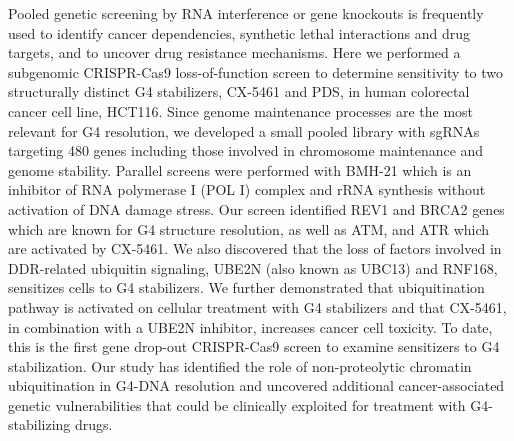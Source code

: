 Pooled genetic screening by RNA interference or gene knockouts is frequently used to identify cancer dependencies, synthetic lethal interactions and drug targets, and to uncover drug resistance mechanisms. Here we performed a subgenomic CRISPR-Cas9 loss-of-function screen to determine sensitivity to two structurally distinct G4 stabilizers, CX-5461 and PDS, in human colorectal cancer cell line, HCT116. Since genome maintenance processes are the most relevant for G4 resolution, we developed a small pooled library with sgRNAs targeting 480 genes including those involved in chromosome maintenance and genome stability. Parallel screens were performed with BMH-21 which is an inhibitor of RNA polymerase I (POL I) complex and rRNA synthesis without activation of DNA damage stress\cite{Colis2014,Peltonen2014,Xu2017}. Our screen identified REV1 and BRCA2 genes which are known for G4 structure resolution, as well as ATM, and ATR which are activated by CX-5461. We also discovered that the loss of factors involved in DDR-related ubiquitin signaling, UBE2N (also known as UBC13) and RNF168, sensitizes cells to G4 stabilizers. We further demonstrated that ubiquitination pathway is activated on cellular treatment with G4 stabilizers and that CX-5461, in combination with a UBE2N inhibitor, increases cancer cell toxicity. To date, this is the first gene drop-out CRISPR-Cas9 screen to examine sensitizers to G4 stabilization. Our study has identified the role of non-proteolytic chromatin ubiquitination in G4-DNA resolution and uncovered additional cancer-associated genetic vulnerabilities that could be clinically exploited for treatment with G4-stabilizing drugs.